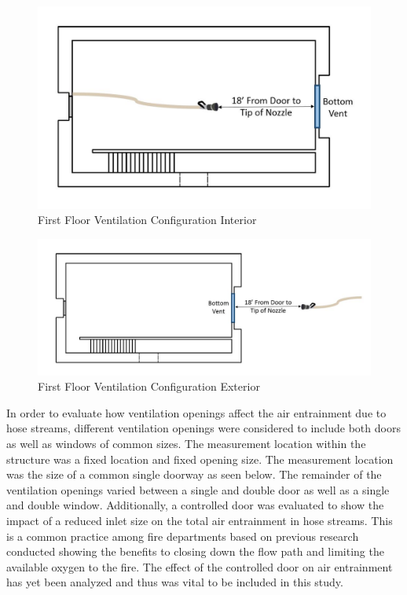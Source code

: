 \documentclass[12pt,oneside]{book}
\begin{document}
\begin{figure}[!ht]
	\centering
	\includegraphics[width=5in]{Figures/Air_Entrainment/Measurement_Location_VentConfig_Bottom.jpg}
	\caption{First Floor Ventilation Configuration Interior}
	\label{fig:First_Floor_Ventilation_Configuration_Interior}
\end{figure}

\begin{figure}[!ht]
	\centering
	\includegraphics[width=6.5in]{Figures/Air_Entrainment/Measurement_Location_VentConfig_Bottom_Ext.jpg}
	\caption{First Floor Ventilation Configuration Exterior}
	\label{fig:First_Floor_Ventilation_Configuration_Exterior}
\end{figure}


In order to evaluate how ventilation openings affect the air entrainment due to hose streams, different ventilation openings were considered to include both doors as well as windows of common sizes. The measurement location within the structure was a fixed location and fixed opening size. The measurement location was the size of a common single doorway as seen below. The remainder of the ventilation openings varied between a single and double door as well as a single and double window. Additionally, a controlled door was evaluated to show the impact of a reduced inlet size on the total air entrainment in hose streams. This is a common practice among fire departments based on previous research conducted showing the benefits to closing down the flow path and limiting the available oxygen to the fire. The effect of the controlled door on air entrainment has yet been analyzed and thus was vital to be included in this study.
\end{document}
